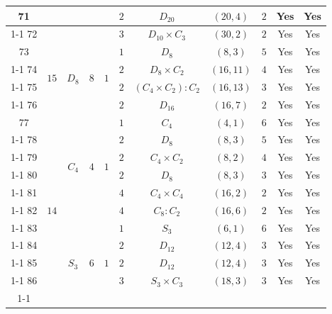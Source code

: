 \documentclass[12pt]{amsart}
\numberwithin{equation}{section}
\theoremstyle{plain}
\theoremstyle{definition}
\theoremstyle{remark}
\begin{document}
{\begin{longtable}{|c|c|c|c|c|c|c|c|c|c|c|}
71 &  &  &  &  & $2$ & \multicolumn{1}{c|}{$D_{20}$} & $(20,4)$ & $2$ & Yes & Yes \\ \cline{1-1} \cline{6-11}
72 &  &  &  &  & $3$ & \multicolumn{1}{c|}{$D_{10}\times C_3$} & $(30,2)$ & $2$ & Yes & Yes \\ \hline
73 & \multirow[t]{4}{*}{$15$} & \multirow[t]{4}{*}{$D_8$} & \multirow[t]{4}{*}{$8$} & \multirow[t]{4}{*}{$1$} & $1$ & \multicolumn{1}{c|}{$D_8$} & $(8,3)$ & $5$ & Yes & Yes \\ \cline{1-1} \cline{6-11}
74 &  &  &  &  & $2$ & \multicolumn{1}{c|}{$D_8\times C_2$} & $(16,11)$ & $4$ & Yes & Yes \\ \cline{1-1} \cline{6-11}
75 &  &  &  &  & $2$ & \multicolumn{1}{c|}{$(C_4\times C_2):C_2$} & $(16,13)$ & $3$ & Yes & Yes \\ \cline{1-1} \cline{6-11}
76 &  &  &  &  & $2$ & \multicolumn{1}{c|}{$D_{16}$} & $(16,7)$ & $2$ & Yes & Yes \\ \hline
77 & \multirow[t]{20}{*}{$14$} & \multirow[t]{6}{*}{$C_4$} & \multirow[t]{6}{*}{$4$} & \multirow[t]{6}{*}{$1$} & $1$ & \multicolumn{1}{c|}{$C_{4}$} & $(4,1)$ & $6$ & Yes & Yes \\ \cline{1-1} \cline{6-11}
78 &  &  &  &  & $2$ & \multicolumn{1}{c|}{$D_8$} & $(8,3)$ & $5$ & Yes & Yes \\ \cline{1-1} \cline{6-11}
79 &  &  &  &  & $2$ & \multicolumn{1}{c|}{$C_{4} \times C_{2}$} & $(8,2)$ & $4$ & Yes & Yes \\ \cline{1-1} \cline{6-11}
80 &  &  &  &  & $2$ & \multicolumn{1}{c|}{$D_8$} & $(8,3)$ & $3$ & Yes & Yes \\ \cline{1-1} \cline{6-11}
81 &  &  &  &  & $4$ & \multicolumn{1}{c|}{$C_{4} \times C_{4}$} & $(16,2)$ & $2$ & Yes & Yes \\ \cline{1-1} \cline{6-11}
82 &  &  &  &  & $4$ & \multicolumn{1}{c|}{$C_8:C_2$} & $(16,6)$ & $2$ & Yes & Yes \\ \cline{1-1} \cline{3-11}
83 &  & \multirow[t]{14}{*}{$S_3$} & \multirow[t]{14}{*}{$6$} & \multirow[t]{5}{*}{$1$} & $1$ & \multicolumn{1}{c|}{$S_3$} & $(6,1)$ & $6$ & Yes & Yes \\ \cline{1-1} \cline{6-11}
84 &  &  &  &  & $2$ & \multicolumn{1}{c|}{$D_{12}$} & $(12,4)$ & $3$ & Yes & Yes \\ \cline{1-1} \cline{6-11}
85 &  &  &  &  & $2$ & \multicolumn{1}{c|}{$D_{12}$} & $(12,4)$ & $3$ & Yes & Yes \\ \cline{1-1} \cline{6-11}
86 &  &  &  &  & $3$ & \multicolumn{1}{c|}{$S_3\times C_3$} & $(18,3)$ & $3$ & Yes & Yes \\ \cline{1-1} \cline{6-11}

\end{longtable}}
\end{document}

